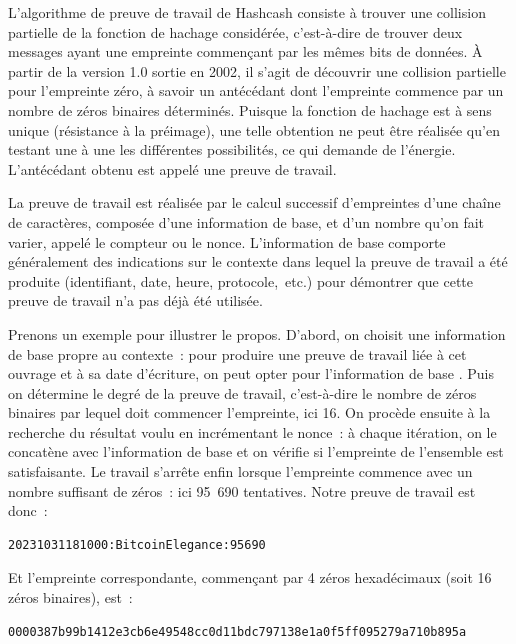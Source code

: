 
L'algorithme de preuve de travail de Hashcash consiste à trouver une collision partielle de la fonction de hachage considérée, c'est-à-dire de trouver deux messages ayant une empreinte commençant par les mêmes bits de données. À partir de la version 1.0 sortie en 2002, il s'agit de découvrir une collision partielle pour l'empreinte zéro, à savoir un antécédant dont l'empreinte commence par un nombre de zéros binaires déterminés. Puisque la fonction de hachage est à sens unique (résistance à la préimage), une telle obtention ne peut être réalisée qu'en testant une à une les différentes possibilités, ce qui demande de l'énergie. L'antécédant obtenu est appelé une preuve de travail.

La preuve de travail est réalisée par le calcul successif d'empreintes d'une chaîne de caractères, composée d'une information de base, et d'un nombre qu'on fait varier, appelé le compteur ou le nonce. L'information de base comporte généralement des indications sur le contexte dans lequel la preuve de travail a été produite (identifiant, date, heure, protocole,~etc.) pour démontrer que cette preuve de travail n'a pas déjà été utilisée.

Prenons un exemple pour illustrer le propos. D'abord, on choisit une information de base propre au contexte~: pour produire une preuve de travail liée à cet ouvrage et à sa date d'écriture, on peut opter pour l'information de base . Puis on détermine le degré de la preuve de travail, c'est-à-dire le nombre de zéros binaires par lequel doit commencer l'empreinte, ici 16. On procède ensuite à la recherche du résultat voulu en incrémentant le nonce~: à chaque itération, on le concatène avec l'information de base et on vérifie si l'empreinte de l'ensemble est satisfaisante. Le travail s'arrête enfin lorsque l'empreinte commence avec un nombre suffisant de zéros~: ici 95~690 tentatives. Notre preuve de travail est donc~:

\begin{Verbatim}[fontsize=\footnotesize]
20231031181000:BitcoinElegance:95690
\end{Verbatim}

Et l'empreinte correspondante, commençant par 4 zéros hexadécimaux (soit 16 zéros binaires), est~:

\begin{Verbatim}[fontsize=\footnotesize]
0000387b99b1412e3cb6e49548cc0d11bdc797138e1a0f5ff095279a710b895a
\end{Verbatim}


